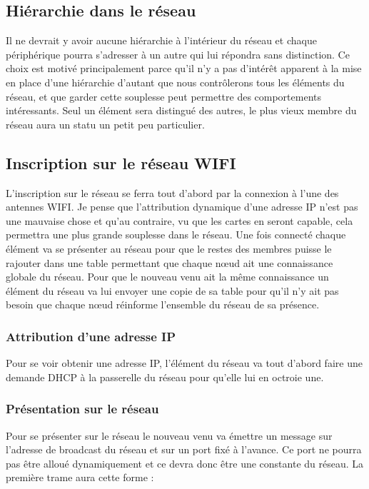 \subsection{Hiérarchie dans le réseau}
Il ne devrait y avoir aucune hiérarchie à l'intérieur du réseau et chaque périphérique pourra s'adresser à un autre qui lui répondra sans distinction. Ce choix est motivé principalement parce qu'il n'y a pas d'intérêt apparent à la mise en place d'une hiérarchie d'autant que nous contrôlerons tous les éléments du réseau, et que garder cette souplesse peut permettre des comportements intéressants.\p
Seul un élément sera distingué des autres, le plus vieux membre du réseau aura un statu un petit peu particulier.

\subsection{Inscription sur le réseau WIFI}
L'inscription sur le réseau se ferra tout d'abord par la connexion à l'une des antennes WIFI. Je pense que l'attribution dynamique d'une adresse IP n'est pas une mauvaise chose et qu'au contraire, vu que les cartes en seront capable, cela permettra une plus grande souplesse dans le réseau.\p
Une fois connecté chaque élément va se présenter au réseau pour que le restes des membres puisse le rajouter dans une table permettant que chaque nœud ait une connaissance globale du réseau. Pour que le nouveau venu ait la même connaissance un élément du réseau va lui envoyer une copie de sa table pour qu'il n'y ait pas besoin que chaque nœud réinforme l'ensemble du réseau de sa présence.

\subsubsection{Attribution d'une adresse IP}
Pour se voir obtenir une adresse IP, l'élément du réseau va tout d'abord faire une demande DHCP à la passerelle du réseau pour qu'elle lui en octroie une.

\subsubsection{Présentation sur le réseau}
Pour se présenter sur le réseau le nouveau venu va émettre un message sur l'adresse de broadcast du réseau et sur un port fixé à l'avance. Ce port ne pourra pas être alloué dynamiquement et ce devra donc être une constante du réseau.\p
La première trame aura cette forme : ~\\

